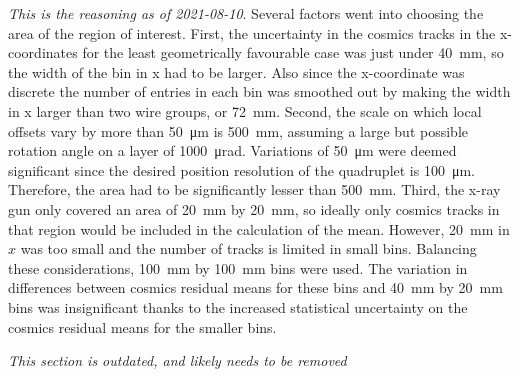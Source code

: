 \textit{This is the reasoning as of 2021-08-10}.
Several factors went into choosing the area of the region of interest. First, the uncertainty in the cosmics tracks in the x-coordinates for the least geometrically favourable case was just under \SI{40}{\milli\meter}, so the width of the bin in x had to be larger. Also since the x-coordinate was discrete the number of entries in each bin was smoothed out by making the width in x larger than two wire groups, or \SI{72}{\milli\meter}. Second, the scale on which local offsets vary by more than \SI{50}{\micro\meter} is \SI{500}{\milli\meter}, assuming a large but possible rotation angle on a layer of \SI{1000}{\micro\radian}. Variations of \SI{50}{\micro\meter} were deemed significant since the desired position resolution of the quadruplet is \SI{100}{\micro\meter}. Therefore, the area had to be significantly lesser than \SI{500}{\milli\meter}. Third, the x-ray gun only covered an area of \SI{20}{\milli\meter} by \SI{20}{\milli\meter}, so ideally only cosmics tracks in that region would be included in the calculation of the mean. However, \SI{20}{\milli\meter} in $x$ was too small and the number of tracks is limited in small bins. Balancing these considerations, \SI{100}{\milli\meter} by \SI{100}{\milli\meter} bins were used. The variation in differences between cosmics residual means for these bins and \SI{40}{\milli\meter} by \SI{20}{\milli\meter} bins was insignificant thanks to the increased statistical uncertainty on the cosmics residual means for the smaller bins.

\textit{This section is outdated, and likely needs to be removed}

